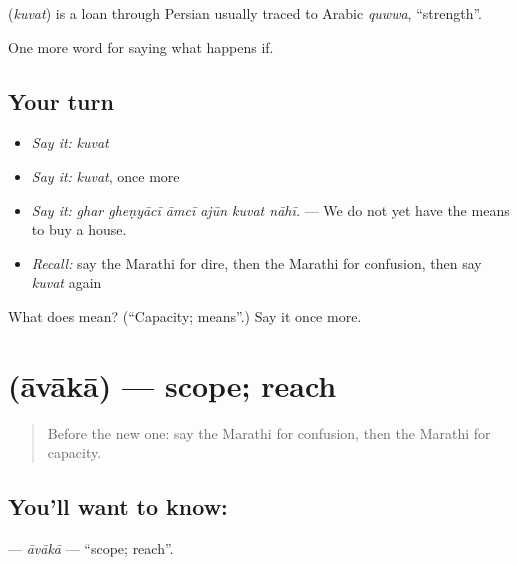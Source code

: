 \begin{cousinweb}
\textbf{} (\emph{kuvat}) is a loan through Persian usually traced to Arabic \emph{quwwa}, \textquotedblleft{}strength\textquotedblright{}.
\end{cousinweb}

\begin{grammarlens}[title={What you've built}]
One more word for saying what happens if.
\end{grammarlens}

\subsection*{Your turn}
\begin{itemize}
\raggedright
  \item \emph{Say it:} \emph{kuvat}
  \item \emph{Say it:} \emph{kuvat}, once more
  \item \emph{Say it:} \emph{ghar gheṇyācī āmcī ajūn kuvat nāhī.} — We do not yet have the means to buy a house.
  \item \emph{Recall:} say the Marathi for dire, then the Marathi for confusion, then say \emph{kuvat} again
\end{itemize}

\begin{tcolorbox}[breakable,colback=teal!4,colframe=teal!35!black,title={Before you move on}]
What does  mean? (\textquotedblleft{}Capacity; means\textquotedblright{}.) Say it once more.
\end{tcolorbox}
\section[\texorpdfstring{\mr{आवाका} (āvākā)}{आवाका (āvākā)}]{ (āvākā) — scope; reach}

\label{lesson:MR-C557-avaka}



\begin{quote}
Before the new one: say the Marathi for confusion, then the Marathi for capacity.
\end{quote}

\subsection*{You'll want to know: }
\textbf{} — \emph{āvākā} — \textquotedblleft{}scope; reach\textquotedblright{}.

